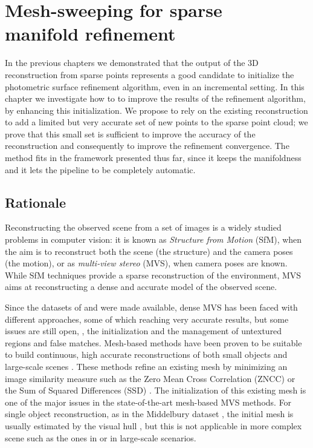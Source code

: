 \chapter[Mesh-sweeping for sparse manifold refinement]{Mesh-sweeping for sparse \\manifold refinement}
\label{ch:sweeping}

In the previous chapters we demonstrated that the output of the 3D reconstruction from sparse points represents a good candidate to initialize the photometric surface refinement algorithm, even in an incremental setting. 
In this chapter we investigate how to to improve the results of the refinement algorithm, by enhancing this initialization. 
We propose to rely on the existing reconstruction to add a limited but very accurate set of new points to the sparse point cloud; we prove that this small set is sufficient to improve the accuracy of the reconstruction and consequently to improve the refinement convergence. 
The method fits in the framework presented thus far, since it keeps the manifoldness and it lets the pipeline to be completely automatic.


\minitoc
\newpage

\section{Rationale}

Reconstructing the observed scene from a set of images is a widely studied problems in computer vision: it is known as \emph{Structure from Motion} (SfM), when the aim is to reconstruct both the scene (the structure) and the camera poses (the motion), or as \emph{multi-view stereo} (MVS), when camera poses are known.
While SfM techniques provide a sparse reconstruction of the environment, MVS aims at reconstructing a dense and accurate model of the observed scene. 

Since the datasets of \cite{seitz_et_al06} and \cite{strecha2008} were made available, dense MVS has been faced with different approaches, some of which reaching very accurate results, but some issues are still open, \eg, the initialization and the management of untextured regions and false matches.
Mesh-based methods have been proven to be suitable to build continuous, high accurate reconstructions of both small objects and large-scale scenes \cite{hiep2009towards,vu_et_al_2012,salman2010surface}.
These methods refine an existing mesh by minimizing an image similarity measure such as the Zero Mean Cross Correlation (ZNCC) \cite{hiep2009towards,pons2007multi,zaharescu2007transformesh} or the Sum of Squared Differences (SSD) \cite{delaunoy_et_al_08,delaunoy2011gradient}. 
The initialization of this existing mesh is one of the major issues in the state-of-the-art mesh-based MVS methods. For single object reconstruction, as in the Middelbury dataset \cite{seitz_et_al06}, the initial mesh is usually estimated by the visual hull \cite{laurentini1994visual}, but this is not applicable in more complex scene such as the ones in \cite{strecha2008} or in large-scale scenarios.


